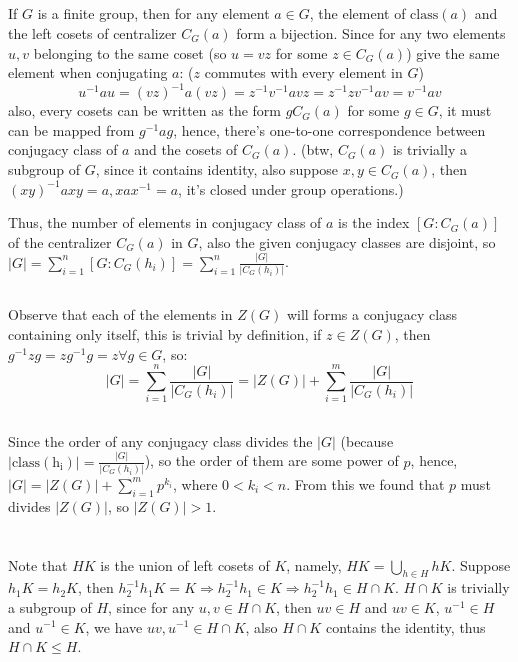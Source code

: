 \documentclass[12pt]{article}
\begin{document}
\subsection{}
If $G$ is a finite group, then for any element $a\in G$, the element of $\mathrm{class}(a)$ and the left cosets of centralizer $C_G(a)$ form a bijection. Since for any two elements $u,v$ belonging to the same coset (so $u=vz$ for some $z\in C_G(a)$) give the same element when conjugating $a$: ($z$ commutes with every element in $G$)
$$u^{-1}au=(vz)^{-1}a(vz)=z^{-1}v^{-1}avz=z^{-1}zv^{-1}av=v^{-1}av$$
also, every cosets can be written as the form $gC_G(a)$ for some $g\in G$, it must can be mapped from $g^{-1}ag$, hence, there's one-to-one correspondence between conjugacy class of $a$ and the cosets of $C_G(a)$. (btw, $C_G(a)$ is trivially a subgroup of $G$, since it contains identity, also suppose $x,y\in C_G(a)$, then $(xy)^{-1}axy=a, xax^{-1}=a$, it's closed under group operations.)

Thus, the number of elements in conjugacy class of $a$ is the index $[G:C_G(a)]$ of the centralizer $C_G(a)$ in $G$, also the given conjugacy classes are disjoint, so $|G|=\displaystyle\sum^n_{i=1}[G:C_G(h_i)]=\displaystyle\sum^n_{i=1}\frac{|G|}{|C_G(h_i)|}$.

\subsection{}
Observe that each of the elements in $Z(G)$ will forms a conjugacy class containing only itself, this is trivial by definition, if $z\in Z(G)$, then $g^{-1}zg=zg^{-1}g=z\forall g\in G$, so:
$$|G|=\displaystyle\sum^n_{i=1}\frac{|G|}{|C_G(h_i)|}=|Z(G)|+\displaystyle\sum^m_{i=1}\frac{|G|}{|C_G(h_i)|}$$
\subsection{}
Since the order of any conjugacy class divides the $|G|$ (because $|\mathrm{class(h_i)}|=\frac{|G|}{|C_G(h_i)|}$), so the order of them are some power of $p$, hence, $|G|=|Z(G)|+\displaystyle\sum^m_{i=1}p^{k_i}$, where $0<k_i<n$. From this we found that $p$ must divides $|Z(G)|$, so $|Z(G)|>1$.

\section{}
\subsection{}
Note that $HK$ is the union of left cosets of $K$, namely, $HK=\bigcup_{h\in H}hK$. Suppose $h_1K=h_2K$, then $h_2^{-1}h_1K=K\Rightarrow h_2^{-1}h_1\in K\Rightarrow h_2^{-1}h_1\in H\cap K$. $H\cap K$ is trivially a subgroup of $H$, since for any $u,v\in H\cap K$, then $uv\in H$ and $uv\in K$, $u^{-1}\in H$ and $u^{-1}\in K$, we have $uv,u^{-1}\in H\cap K$, also $H\cap K$ contains the identity, thus $H\cap K\le H$.
\end{document}
